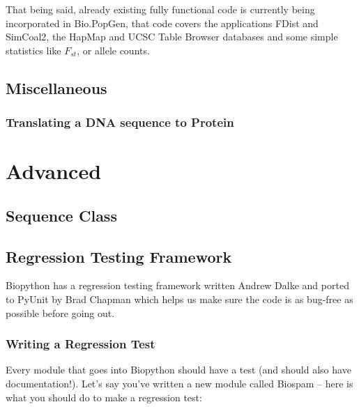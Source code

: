 \documentclass{report}
\begin{document}
That being said, already existing fully functional code is currently being
incorporated in Bio.PopGen, that code covers the applications FDist and
SimCoal2, the HapMap and UCSC Table Browser databases and some simple statistics
like $F_{st}$, or allele counts.



\section{Miscellaneous}

\subsection{Translating a DNA sequence to Protein}

\chapter{Advanced}

\section{Sequence Class}

\section{Regression Testing Framework}
\label{sec:regr_test}

Biopython has a regression testing framework written Andrew Dalke and ported to PyUnit by Brad Chapman which helps us make sure the code is as bug-free as possible before going out.

\subsection{Writing a Regression Test}

Every module that goes into Biopython should have a test (and should also have documentation!). Let's say you've written a new module called Biospam -- here is what you should do to make a regression test:
\end{document}
